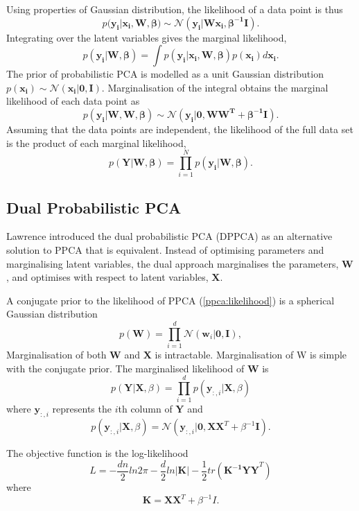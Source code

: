 \documentclass[ %
                    author={Dillon Keith Diep},
                supervisor={Dr. Carl Henrik Ek},
                    degree={MEng},
                     title={Assisted Content Generation for 3D Hair Geometry},
                  subtitle={[INCOMPLETE DRAFT, CONTAINS NOTES FROM RESEARCH]},
                      type={Research},
                      year={2014} ]{dissertation}
\begin{document}
Using properties of Gaussian distribution, the likelihood of a data point is thus
\begin{equation} \label{ppca:likelihood}
p(\mathbf{y_i|x_i,W,\beta)\sim\mathcal{N}(y_i|Wx_i,\beta^{-1}I)}.
\end{equation}
Integrating over the latent variables gives the marginal likelihood,
$$p(\mathbf{y_i|W,\beta})=\int p(\mathbf{y_i|x_i,W,\beta})p(\mathbf{x_i})d\mathbf{x_i}.$$
The prior of probabilistic PCA is modelled as a unit Gaussian distribution $p(\mathbf{x_i})\sim\mathcal{N}(\mathbf{x_i|0,I})$.
Marginalisation of the integral obtains the marginal likelihood of each data point as
$$p(\mathbf{y_i|W,W,\beta})\sim\mathcal{N}(\mathbf{y_i|0,WW^T+\beta^{-1}I}).$$
Assuming that the data points are independent, the likelihood of the full data set is the product of each marginal likelihood,
$$p(\mathbf{Y|W,\beta})=\prod^N_{i=1} p(\mathbf{y_i|W,\beta}).$$

\subsection{Dual Probabilistic PCA}
Lawrence introduced the dual probabilistic PCA (DPPCA) as an alternative solution to PPCA that is equivalent. Instead of optimising parameters and marginalising latent variables, the dual approach marginalises the parameters, $\mathbf{W}$, and optimises with respect to latent variables, $\mathbf{X}$.

A conjugate prior to the likelihood of PPCA (\ref{ppca:likelihood}) is a spherical Gaussian distribution
$$p(\mathbf{W})=\prod^d_{i=1}\mathcal{N}(\mathbf{w}_i|\mathbf{0,I}),$$
Marginalisation of both $\mathbf{W}$ and $\mathbf{X}$ is intractable. Marginalisation of W is simple with the conjugate prior. The marginalised likelihood of $\mathbf{W}$ is
$$p(\mathbf{Y|X},\beta)=\prod^d_{i=1}p(\mathbf{y}_{:,i}|\mathbf{X},\beta)$$
where $\mathbf{y}_{:,i}$ represents the $i$th column of $\mathbf{Y}$ and
$$p(\mathbf{y}_{:,i}|\mathbf{X},\beta)=\mathcal{N}(\mathbf{y}_{:,i}|\mathbf{0,XX}^T+\beta^{-1}\mathbf{I}).$$

The objective function is the log-likelihood
\begin{equation} \label{dppca:loglikelihood}
	L=-\frac{dn}{2}ln2\pi-\frac{d}{2}ln|\mathbf{K}|-\frac{1}{2}tr(\mathbf{K^{-1}YY}^T)
\end{equation}
where $$\mathbf{K=XX}^T+\beta^{-1}I.$$
\end{document}
